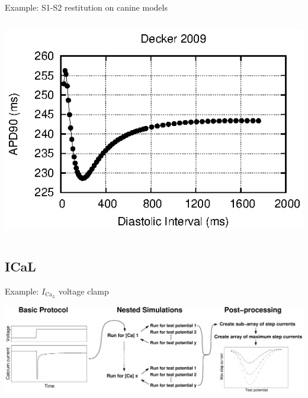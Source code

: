\documentclass[t,xcolor={usenames,dvipsnames}]{beamer}
\begin{document}
\begin{frame}{Example: S1-S2 restitution on canine models}
\begin{columns}[T]
\begin{column}{.33\linewidth}
\begin{center}
\vspace{.1cm}
\includegraphics[width=\textwidth]{decker_2009_s1s2_curve}
\end{center}
\end{column}
\end{columns}
\end{frame}

\subsection*{ICaL}

\begin{frame}{Example: $I_{\textrm{Ca}_L}$ voltage clamp}
\begin{center}
\includegraphics[width=\textwidth]{ICaLIntro}
\end{center}
\end{frame}
\end{document}

